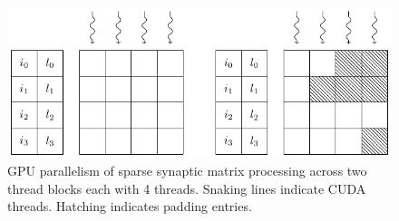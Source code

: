 \documentclass[utf8]{frontiersSCNS} %
\begin{document}
\begin{figure}
    \begin{center}
        \includegraphics[width=118mm]{figures/ragged_matrix}
    \end{center}
    \caption{GPU parallelism of sparse synaptic matrix processing across two thread blocks each with \num{4} threads.
    Snaking lines indicate CUDA threads.
    Hatching indicates padding entries.}
    \label{fig:ragged_matrix}
\end{figure}
\end{document}
